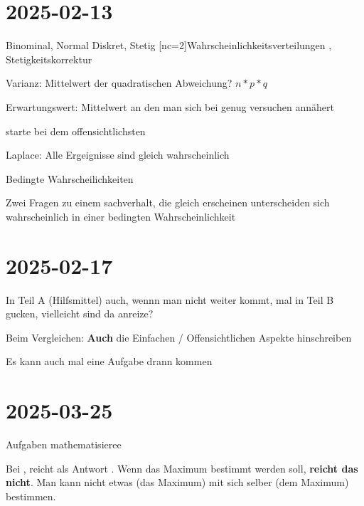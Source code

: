 \section{2025-02-13}

\startplacetable[location={here},title={Bin vs Normal}]
\setupTABLE[r][1][background=color,backgroundcolor=gray]
\bTABLE
\startCSV
Binominal, Normal
Diskret, Stetig
[nc=2]Wahrscheinlichkeitsverteilungen
, Stetigkeitskorrektur
\stopCSV
\eTABLE
\stopplacetable

Varianz: Mittelwert der quadratischen Abweichung? $n * p * q$


Erwartungswert: Mittelwert an den man sich bei genug versuchen annähert

\startframedtipp
starte bei dem offensichtlichsten
\stopframedtipp


\startitemize[packed]
\item Laplace: Alle Ergeignisse sind gleich wahrscheinlich
\stopitemize


\startframedtipp
\startitemize[packed]
\item Bedingte Wahrscheilichkeiten
\item Zwei Fragen zu einem sachverhalt, die gleich erscheinen unterscheiden sich wahrscheinlich in einer bedingten Wahrscheinlichkeit
\stopitemize
\stopframedtipp


\section{2025-02-17}

\startframedtipp
\startitemize[packed]
\item In Teil A (Hilfsmittel) auch, wennn man nicht weiter kommt, mal in Teil B gucken, vielleicht sind da anreize?
\item Beim Vergleichen: {\bf Auch} die Einfachen / Offensichtlichen Aspekte hinschreiben
\item Es kann auch mal eine  Aufgabe drann kommen
\stopitemize
\stopframedtipp


\section{2025-03-25}

\startitemize[packed]
\item Aufgaben mathematisieree
\item Bei , reicht als
Antwort . Wenn das Maximum bestimmt werden soll,
{\bf reicht das nicht}. Man kann nicht etwas (das Maximum) mit sich selber (dem
Maximum) bestimmen.
\stopitemize
